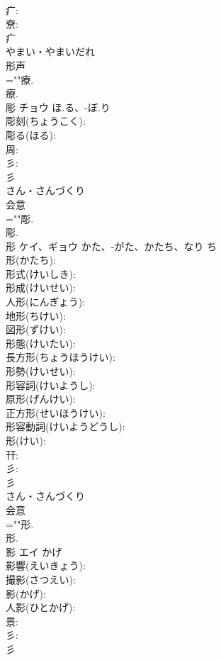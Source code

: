 \documentclass[8pt]{extreport}
\begin{document}
\begin{CJK}{UTF8}{min}
\\	疒: 
\\	尞: 
\\	疒	
\\	やまい・やまいだれ	
\\	形声 
\\	=""療.
\\	療.
\\	彫	チョウ	ほ.る、-ぼ.り		
\\	彫刻(ちょうこく): 
\\	彫る(ほる): 
\\	周: 
\\	彡: 
\\	彡	
\\	さん・さんづくり	
\\	会意 
\\	=""彫.
\\	彫.
\\	形	ケイ、ギョウ	かた、-がた、かたち、なり	ち	
\\	形(かたち): 
\\	形式(けいしき): 
\\	形成(けいせい): 
\\	人形(にんぎょう): 
\\	地形(ちけい): 
\\	図形(ずけい): 
\\	形態(けいたい): 
\\	長方形(ちょうほうけい): 
\\	形勢(けいせい): 
\\	形容詞(けいようし): 
\\	原形(げんけい): 
\\	正方形(せいほうけい): 
\\	形容動詞(けいようどうし): 
\\	形(けい): 
\\	幵: 
\\	彡: 
\\	彡	
\\	さん・さんづくり	
\\	会意 
\\	=""形.
\\	形.
\\	影	エイ	かげ		
\\	影響(えいきょう): 
\\	撮影(さつえい): 
\\	影(かげ): 
\\	人影(ひとかげ): 
\\	景: 
\\	彡: 
\\	彡	

\end{CJK}
\end{document}
